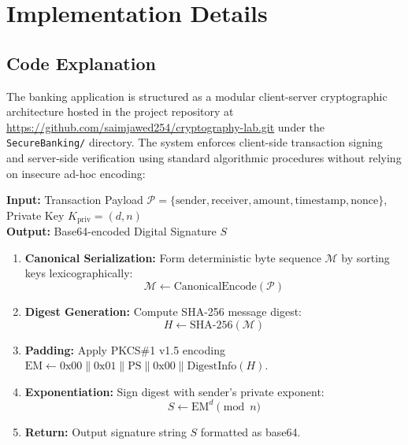 \documentclass[11pt,a4paper]{article}
\begin{document}
\section{Implementation Details}

\subsection{Code Explanation}
The banking application is structured as a modular client-server cryptographic architecture hosted in the project repository at \url{https://github.com/saimjawed254/cryptography-lab.git} under the \texttt{SecureBanking/} directory. The system enforces client-side transaction signing and server-side verification using standard algorithmic procedures without relying on insecure ad-hoc encoding:

\begin{tcolorbox}[colback=codebg,colframe=codeborder,title=\textbf{Algorithm 1: Client-Side Transaction Signing Procedure}]
\textbf{Input:} Transaction Payload $\mathcal{P} = \{\text{sender}, \text{receiver}, \text{amount}, \text{timestamp}, \text{nonce}\}$, Private Key $K_{\text{priv}} = (d, n)$\\
\textbf{Output:} Base64-encoded Digital Signature $S$
\begin{enumerate}
    \item \textbf{Canonical Serialization:} Form deterministic byte sequence $\mathcal{M}$ by sorting keys lexicographically:
    \begin{equation}
        \mathcal{M} \leftarrow \text{CanonicalEncode}(\mathcal{P})
    \end{equation}
    \item \textbf{Digest Generation:} Compute SHA-256 message digest:
    \begin{equation}
        H \leftarrow \text{SHA-256}(\mathcal{M})
    \end{equation}
    \item \textbf{Padding:} Apply PKCS\#1 v1.5 encoding $\text{EM} \leftarrow \text{0x00} \parallel \text{0x01} \parallel \text{PS} \parallel \text{0x00} \parallel \text{DigestInfo}(H)$.
    \item \textbf{Exponentiation:} Sign digest with sender's private exponent:
    \begin{equation}
        S \leftarrow \text{EM}^d \pmod n
    \end{equation}
    \item \textbf{Return:} Output signature string $S$ formatted as base64.
\end{enumerate}
\end{tcolorbox}
\end{document}
